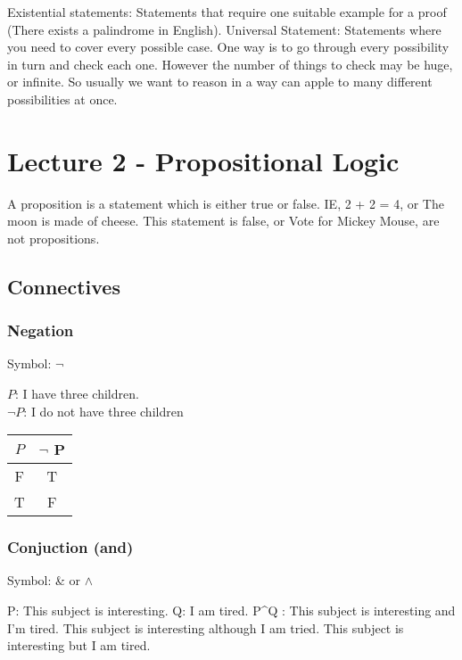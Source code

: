 \documentclass[11pt, oneside]{article}   	%
\begin{document}
Existential statements: Statements that require one suitable example for a proof (There exists a palindrome in English).
Universal Statement: Statements where you need to cover every possible case. One way is to go through every possibility in turn and check each one. However the number of things to check may be huge, or infinite. So usually we want to reason in a way can apple to many different possibilities at once.

\section{Lecture 2 - Propositional Logic}

A proposition is a statement which is either true or false. IE, 2 + 2 = 4, or The moon is made of cheese. This statement is false, or Vote for Mickey Mouse, are not propositions.

\subsection{Connectives}
\subsubsection{Negation}

Symbol: $\neg$

$P$: I have three children.\\
$\neg P$: I do not have three children

\begin{table}[htbp]
   \centering
   \begin{tabular}{@{} c|c @{}} %
      $P$ & $\neg$ P\\
      \midrule
      F      & T\\
      T       & F \\
   \end{tabular}
   \label{tab:booktabs}
\end{table}
\subsubsection{Conjuction (and)}
Symbol: \& or $\wedge$

P: This subject is interesting.
Q: I am tired.
P\textasciicircum Q : This subject is interesting and I'm tired. This subject is interesting although I am tried. This subject is interesting but I am tired.
\end{document}
